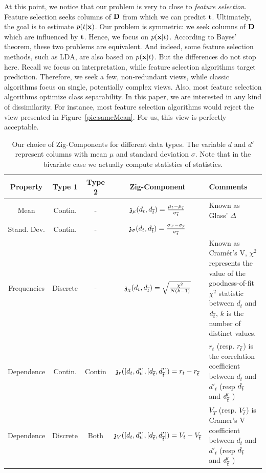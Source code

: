 At this point, we notice that our problem is very to close to \emph{feature
selection}. Feature selection seeks columns of $\mathbf{D}$ from which we can
predict $\mathbf{t}$. Ultimately, the goal is to estimate $p(t|\mathbf{x})$. Our
problem is symmetric: we seek columns of $\mathbf{D}$ which are influenced by
$\mathbf{t}$. Hence, we focus on $p(\mathbf{x}|t)$. According to Bayes' theorem, these
two problems are equivalent. And indeed, some feature selection methods, such
as LDA, are also based on $p(\mathbf{x}|t)$. But the differences do not stop here.
Recall we focus on interpretation, while feature selection algorithms
target prediction. Therefore, we seek a few, non-redundant views, while
classic algorithms focus on single, potentially complex views. Also, most
feature selection algorithms optimize class separability. In this paper, we are
interested in any kind of dissimilarity. For instance, most feature selection
algorithms would reject the view presented in Figure~\ref{pic:sameMean}. For
us, this view is perfectly acceptable. 
\begin{table}[t]
    \centering
    \begin{tabular}{|c|c|c|c|p{7cm}|}
      \hline
      Property & Type 1 & Type 2 & Zig-Component & Comments\\
      \hline
      Mean        & Contin.  & - &
      $  \mathfrak{z}_\mu (d_t, d_{\overline{t}}) = \frac{\mu_t - \mu_{\overline{t}}}{
      \sigma_{\overline{t}}}$&  Known as Glass' $\Delta$  \\

     Stand. Dev.& Contin.  & - &
      $ \mathfrak{z}_\sigma (d_t, d_{\overline{t}}) =  \frac{\sigma_T - \sigma_{\overline{t}}}{ \sigma_{\overline{t}}}$ & \\
    
      Frequencies & Discrete & - & 
    $  \mathfrak{z}_\chi (d_t, d_{\overline{t}}) =  \sqrt{\frac{\chi^2}{N(k - 1)}}$ & Known
          as Cram\'er's V, $\chi^2$ represents the value of the
          goodness-of-fit $\chi^2$ statistic between $d_t$ and $d_{\overline{t}}$, $k$
          is the number of distinct values.\\
      
          \hline
      Dependence  & Contin. & Contin & $
      \mathfrak{z}_r ([d_t, d'_t ], [d_{\overline{t}}, d'_{\overline{t}} ]) =     r_t - r_{\overline{t}} $ & 
      $r_t$ (resp. $r_{\overline{t}}$) is the correlation coefficient between $d_t$
      and  $d'_t$ (resp   $d_{\overline{t}}$ and  $d'_{\overline{t}}$ ) \\
      Dependence  & Discrete & Both &

      $ \mathfrak{z}_V ([d_t, d'_t ], [d_{\overline{t}}, d'_{\overline{t}} ]) = V_t - V_{\overline{t}} $ &
           $V_T$ (resp. $V_{\overline{t}}$) is Cramer's V coefficient between $d_t$
      and  $d'_t$ (resp   $d_{\overline{t}}$ and  $d'_{\overline{t}}$ ) \\ 
      \hline
    \end{tabular}
\caption{Our choice of Zig-Components for different data types. The variable
    $d$ and $d'$ represent columns with mean $\mu$ and
    standard deviation $\sigma$. Note that in the bivariate case we actually compute statistics of statistics.}
    \label{tab:dissim}
\end{table}

